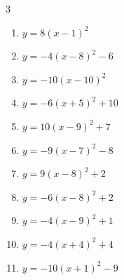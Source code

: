 \begin{multicols}{3}
\begin{enumerate}
  \item $\displaystyle y=8\left( x-1\right)^{2}$

        \phantom{$\displaystyle 頂点\left( 1 , 0 \right)$}

  \item $\displaystyle y=-4\left( x-8\right)^{2}-6$

        \phantom{$\displaystyle 頂点\left( 8 , -6 \right)$}

  \item $\displaystyle y=-10\left( x-10\right)^{2}$

        \phantom{$\displaystyle 頂点\left( 10 , 0 \right)$}

  \item $\displaystyle y=-6\left( x+5\right)^{2}+10$

        \phantom{$\displaystyle 頂点\left( -5 , 10 \right)$}

  \item $\displaystyle y=10\left( x-9\right)^{2}+7$

        \phantom{$\displaystyle 頂点\left( 9 , 7 \right)$}

\columnbreak %

  \item $\displaystyle y=-9\left( x-7\right)^{2}-8$

        \phantom{$\displaystyle 頂点\left( 7 , -8 \right)$}

  \item $\displaystyle y=9\left( x-8\right)^{2}+2$

        \phantom{$\displaystyle 頂点\left( 8 , 2 \right)$}

  \item $\displaystyle y=-6\left( x-8\right)^{2}+2$

        \phantom{$\displaystyle 頂点\left( 8 , 2 \right)$}

  \item $\displaystyle y=-4\left( x-9\right)^{2}+1$

        \phantom{$\displaystyle 頂点\left( 9 , 1 \right)$}

  \item $\displaystyle y=-4\left( x+4\right)^{2}+4$

        \phantom{$\displaystyle 頂点\left( -4 , 4 \right)$}

  \item $\displaystyle y=-10\left( x+1\right)^{2}-9$

        \phantom{$\displaystyle 頂点\left( -1 , -9 \right)$}


\end{enumerate}
\end{multicols}
